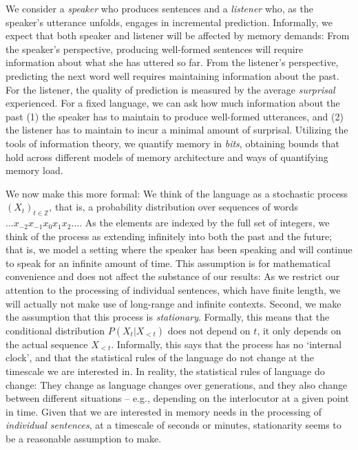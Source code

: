 \documentclass[11pt,letterpaper]{article}
\begin{document}
We consider a \emph{speaker} who produces sentences and a \emph{listener} who, as the speaker's utterance unfolds, engages in incremental prediction.
Informally, we expect that both speaker and listener will be affected by memory demands:
From the speaker's perspective, producing well-formed sentences will require information about what she has uttered so far.
From the listener's perspective, predicting the next word well requires maintaining information about the past.
For the listener, the quality of prediction is measured by the average \emph{surprisal} experienced.
For a fixed language, we can ask how much information about the past (1) the speaker has to maintain to produce well-formed utterances, and (2) the listener has to maintain to incur a minimal amount of surprisal.
Utilizing the tools of information theory, we quantify memory in \emph{bits}, obtaining bounds that hold across different models of memory architecture and ways of quantifying memory load.




We now make this more formal:
We think of the language as a stochastic process $(X_t)_{t \in \mathbb{Z}}$, that is, a probability distribution over sequences of words $\dots x_{-2} x_{-1} x_0 x_{1} x_{2} \dots$.
As the elements are indexed by the full set of integers, we think of the process as extending infinitely into both the past and the future; that is, we model a setting where the speaker has been speaking and will continue to speak for an infinite amount of time.
This assumption is for mathematical convenience and does not affect the substance of our results: As we restrict our attention to the processing of individual sentences, which have finite length, we will actually not make use of long-range and infinite contexts.
Second, we make the assumption that this process is \emph{stationary}.
Formally, this means that the conditional distribution $P(X_t|X_{<t})$ does not depend on $t$, it only depends on the actual sequence $X_{<t}$.
Informally, this says that the process has no `internal clock', and that the statistical rules of the language do not change at the timescale we are interested in.
In reality, the statistical rules of language do change: They change as language changes over generations, and they also change between different situations -- e.g., depending on the interlocutor at a given point in time.
Given that we are interested in memory needs in the processing of \emph{individual sentences}, at a timescale of seconds or minutes, stationarity seems to be a reasonable assumption to make.
\end{document}
